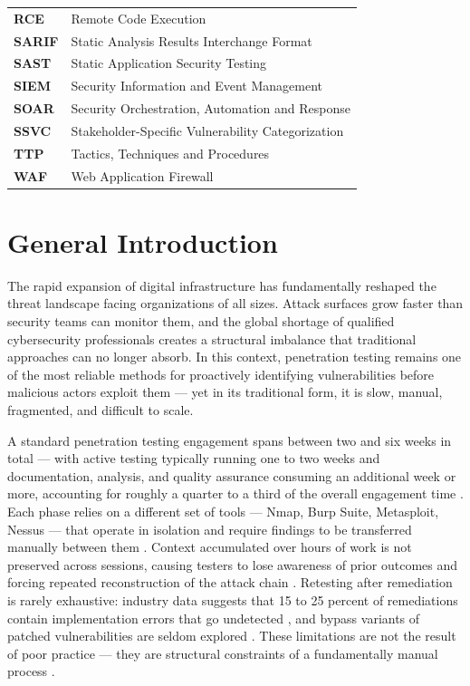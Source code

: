\documentclass[12pt,a4paper]{report}
\begin{document}
\begin{longtable}{>{\bfseries}p{3.5cm} p{10.5cm}}
RCE         & Remote Code Execution \\
SARIF       & Static Analysis Results Interchange Format \\
SAST        & Static Application Security Testing \\
SIEM        & Security Information and Event Management \\
SOAR        & Security Orchestration, Automation and Response \\
SSVC        & Stakeholder-Specific Vulnerability Categorization \\
TTP         & Tactics, Techniques and Procedures \\
WAF         & Web Application Firewall \\
\bottomrule
\end{longtable}

\newpage
{}
\setcounter{page}{1}
\thispagestyle{fancy}
\chapter*{General Introduction}

The rapid expansion of digital infrastructure has fundamentally reshaped the threat
landscape facing organizations of all sizes. Attack surfaces grow faster than security
teams can monitor them, and the global shortage of qualified cybersecurity professionals
creates a structural imbalance that traditional approaches can no longer absorb. In this
context, penetration testing remains one of the most reliable methods for proactively
identifying vulnerabilities before malicious actors exploit them --- yet in its traditional
form, it is slow, manual, fragmented, and difficult to scale.

\vspace{0.8cm}

A standard penetration testing engagement spans between two and six weeks in total ---
with active testing typically running one to two weeks and documentation, analysis, and
quality assurance consuming an additional week or more, accounting for roughly a quarter
to a third of the overall engagement time \cite{triaxiomTimeline,valuementorLifecycle}.
Each phase relies on a different set of tools --- Nmap, Burp Suite, Metasploit, Nessus ---
that operate in isolation and require findings to be transferred manually between them
\cite{autosecagent2026,emazzantiTools}. Context accumulated over hours of work is not
preserved across sessions, causing testers to lose awareness of prior outcomes and
forcing repeated reconstruction of the attack chain \cite{pentestgpt2023}. Retesting
after remediation is rarely exhaustive: industry data suggests that 15 to 25 percent of
remediations contain implementation errors that go undetected \cite{hedgehogRetesting},
and bypass variants of patched vulnerabilities are seldom explored
\cite{redleggRetesting,halockVerification}. These limitations are not the result of poor
practice --- they are structural constraints of a fundamentally manual process
\cite{autosecagent2026,cycognitoPentest}.
\end{document}
